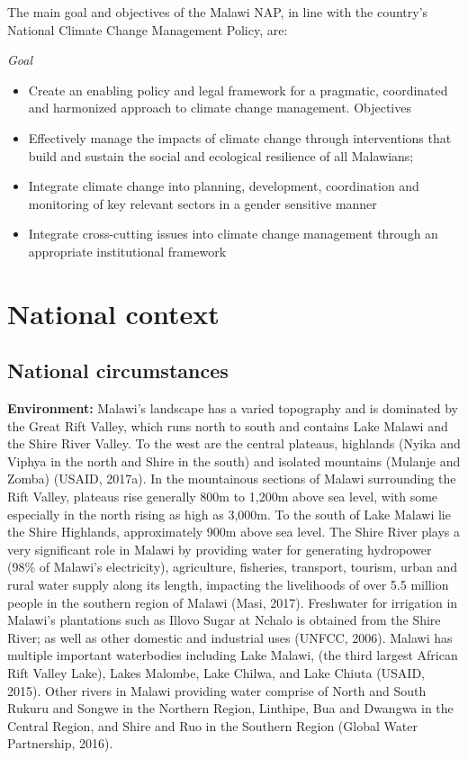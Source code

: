 \documentclass[
]{book}
\providecommand{\tightlist}{%
  \setlength{\itemsep}{0pt}\setlength{\parskip}{0pt}}
\begin{document}
The main goal and objectives of the Malawi NAP, in line with the country's National Climate Change Management Policy, are:

\emph{Goal}

\begin{itemize}
\tightlist
\item
  Create an enabling policy and legal framework for a pragmatic, coordinated and harmonized approach to climate change management.
  Objectives\\
\item
  Effectively manage the impacts of climate change through interventions that build and sustain the social and ecological resilience of all Malawians;\\
\item
  Integrate climate change into planning, development, coordination and monitoring of key relevant sectors in a gender sensitive manner\\
\item
  Integrate cross-cutting issues into climate change management through an appropriate institutional framework
\end{itemize}

\hypertarget{national-context}{%
\chapter{National context}\label{national-context}}

\hypertarget{national-circumstances}{%
\section{National circumstances}\label{national-circumstances}}

\textbf{Environment:} Malawi's landscape has a varied topography and is dominated by the Great Rift Valley, which runs north to south and contains Lake Malawi and the Shire River Valley. To the west are the central plateaus, highlands (Nyika and Viphya in the north and Shire in the south) and isolated mountains (Mulanje and Zomba) (USAID, 2017a). In the mountainous sections of Malawi surrounding the Rift Valley, plateaus rise generally 800m to 1,200m above sea level, with some especially in the north rising as high as 3,000m. To the south of Lake Malawi lie the Shire Highlands, approximately 900m above sea level. The Shire River plays a very significant role in Malawi by providing water for generating hydropower (98\% of Malawi's electricity), agriculture, fisheries, transport, tourism, urban and rural water supply along its length, impacting the livelihoods of over 5.5 million people in the southern region of Malawi (Masi, 2017). Freshwater for irrigation in Malawi's plantations such as Illovo Sugar at Nchalo is obtained from the Shire River; as well as other domestic and industrial uses (UNFCC, 2006). Malawi has multiple important waterbodies including Lake Malawi, (the third largest African Rift Valley Lake), Lakes Malombe, Lake Chilwa, and Lake Chiuta (USAID, 2015). Other rivers in Malawi providing water comprise of North and South Rukuru and Songwe in the Northern Region, Linthipe, Bua and Dwangwa in the Central Region, and Shire and Ruo in the Southern Region (Global Water Partnership, 2016).
\end{document}
